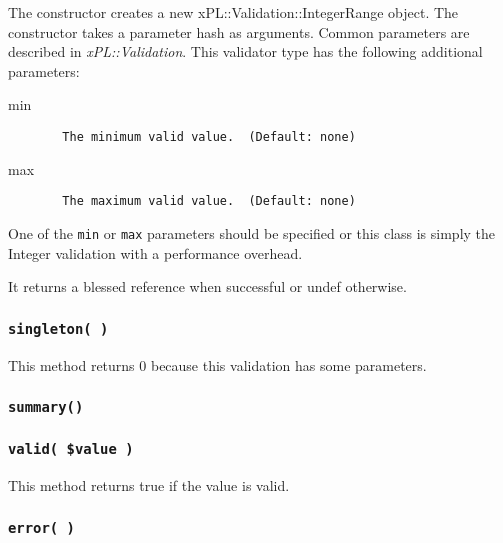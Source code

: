 The constructor creates a new xPL::Validation::IntegerRange object.
The constructor takes a parameter hash as arguments.  Common
parameters are described in \emph{xPL::Validation}.  This validator type
has the following additional parameters:

\begin{description}

\item[{min}] \mbox{}\begin{verbatim}
  The minimum valid value.  (Default: none)
\end{verbatim}

\item[{max}] \mbox{}\begin{verbatim}
  The maximum valid value.  (Default: none)
\end{verbatim}
\end{description}


One of the \texttt{min} or \texttt{max} parameters should be specified or this
class is simply the Integer validation with a performance overhead.



It returns a blessed reference when successful or undef otherwise.

\subsubsection*{\texttt{singleton( )}\label{xPL::Validation::IntegerRange_singleton_}}


This method returns 0 because this validation has some parameters.

\subsubsection*{\texttt{summary()}\label{xPL::Validation::IntegerRange_summary_}}
\subsubsection*{\texttt{valid( \$value )}\label{xPL::Validation::IntegerRange_valid_value_}}


This method returns true if the value is valid.

\subsubsection*{\texttt{error( )}\label{xPL::Validation::IntegerRange_error_}}


